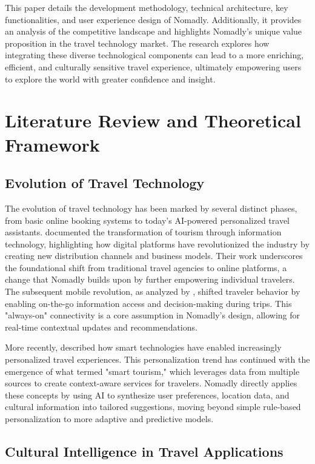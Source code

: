 \documentclass[11pt, a4paper]{article}
\begin{document}
This paper details the development methodology, technical architecture, key functionalities, and user experience design of Nomadly. Additionally, it provides an analysis of the competitive landscape and highlights Nomadly's unique value proposition in the travel technology market. The research explores how integrating these diverse technological components can lead to a more enriching, efficient, and culturally sensitive travel experience, ultimately empowering users to explore the world with greater confidence and insight.

\section{Literature Review and Theoretical Framework}

\subsection{Evolution of Travel Technology}

The evolution of travel technology has been marked by several distinct phases, from basic online booking systems to today's AI-powered personalized travel assistants. \cite{buhalis2008} documented the transformation of tourism through information technology, highlighting how digital platforms have revolutionized the industry by creating new distribution channels and business models. Their work underscores the foundational shift from traditional travel agencies to online platforms, a change that Nomadly builds upon by further empowering individual travelers. The subsequent mobile revolution, as analyzed by \cite{wang2012}, shifted traveler behavior by enabling on-the-go information access and decision-making during trips. This "always-on" connectivity is a core assumption in Nomadly's design, allowing for real-time contextual updates and recommendations.

More recently, \cite{neuhofer2015} described how smart technologies have enabled increasingly personalized travel experiences. This personalization trend has continued with the emergence of what \cite{gretzel2015} termed "smart tourism," which leverages data from multiple sources to create context-aware services for travelers. Nomadly directly applies these concepts by using AI to synthesize user preferences, location data, and cultural information into tailored suggestions, moving beyond simple rule-based personalization to more adaptive and predictive models.

\subsection{Cultural Intelligence in Travel Applications}
\end{document}

